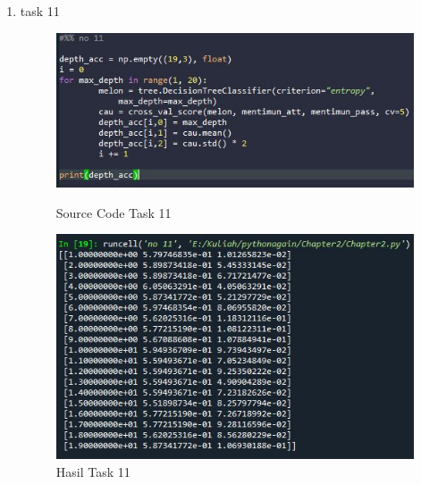\begin{enumerate}
\item task 11
\begin{figure}[!htbp]
    \centering
    \includegraphics[scale=0.5]{figures/Chap11-1.JPG}
	\caption{Source Code Task 11}
    \includegraphics[scale=0.5]{figures/Chap11-1.1.JPG}
	\caption{Hasil Task 11}
\end{figure}


\end{enumerate}
